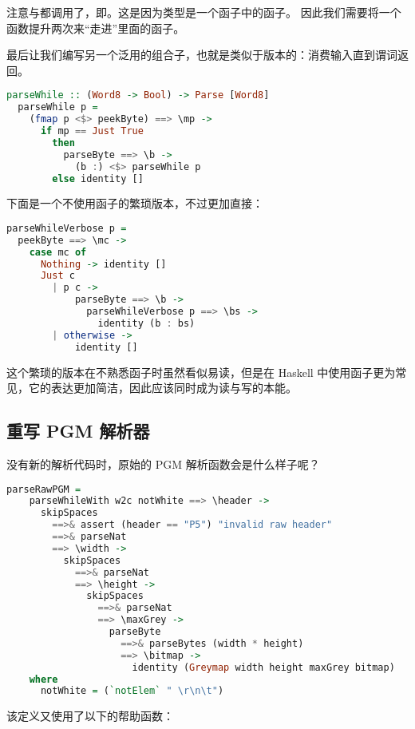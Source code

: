 \documentclass[./main.tex]{subfiles}
\begin{document}
注意与都调用了，即\acode{(<\$>)}。这是因为类型是一个函子中的函子。
因此我们需要将一个函数提升两次来“走进”里面的函子。

最后让我们编写另一个泛用的组合子，也就是类似于版本的：消费输入直到谓词返回。

\begin{lstlisting}[language=Haskell]
  parseWhile :: (Word8 -> Bool) -> Parse [Word8]
  parseWhile p =
    (fmap p <$> peekByte) ==> \mp ->
      if mp == Just True
        then
          parseByte ==> \b ->
            (b :) <$> parseWhile p
        else identity []
\end{lstlisting}

下面是一个不使用函子的繁琐版本，不过更加直接：

\begin{lstlisting}[language=Haskell]
  parseWhileVerbose p =
  peekByte ==> \mc ->
    case mc of
      Nothing -> identity []
      Just c
        | p c ->
            parseByte ==> \b ->
              parseWhileVerbose p ==> \bs ->
                identity (b : bs)
        | otherwise ->
            identity []
\end{lstlisting}

这个繁琐的版本在不熟悉函子时虽然看似易读，但是在 Haskell 中使用函子更为常见，它的表达更加简洁，因此应该同时成为读与写的本能。

\subsection*{重写 PGM 解析器}

没有新的解析代码时，原始的 PGM 解析函数会是什么样子呢？

\begin{lstlisting}[language=Haskell]
  parseRawPGM =
    parseWhileWith w2c notWhite ==> \header ->
      skipSpaces
        ==>& assert (header == "P5") "invalid raw header"
        ==>& parseNat
        ==> \width ->
          skipSpaces
            ==>& parseNat
            ==> \height ->
              skipSpaces
                ==>& parseNat
                ==> \maxGrey ->
                  parseByte
                    ==>& parseBytes (width * height)
                    ==> \bitmap ->
                      identity (Greymap width height maxGrey bitmap)
    where
      notWhite = (`notElem` " \r\n\t")
\end{lstlisting}

该定义又使用了以下的帮助函数：
\end{document}
